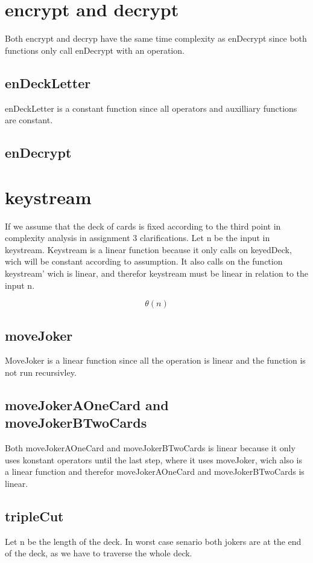 \documentclass[12pt, a4paper]{article}
\begin{document}
\section{encrypt and decrypt}
Both encrypt and decryp have the same time complexity as enDecrypt since both functions only call enDecrypt with an operation.

\subsection{enDeckLetter}
enDeckLetter is a constant function since all operators and auxilliary functions are constant.

\subsection{enDecrypt}



\section{keystream}
If we assume that the deck of cards is fixed according to the third point in complexity analysis in assignment 3 clarifications. Let n be the input in keystream.
Keystream is a linear function because it only calls on keyedDeck, wich will be constant according to assumption. It also calls on the function keystream' wich is linear, and therefor keystream must be linear in relation to the input n.

$$ \theta(n)$$

\subsection{moveJoker}
MoveJoker is a linear function since all the operation is linear and the function is not run recursivley.

\subsection{moveJokerAOneCard and moveJokerBTwoCards}
Both moveJokerAOneCard and moveJokerBTwoCards is linear because it only uses konstant operators until the last step, where it uses moveJoker, wich also is a linear function and therefor moveJokerAOneCard and moveJokerBTwoCards is linear.

\subsection{tripleCut}
Let n be the length of the deck. In worst case senario both jokers are at the end of the deck, as we have to traverse the whole deck.
\end{document}
